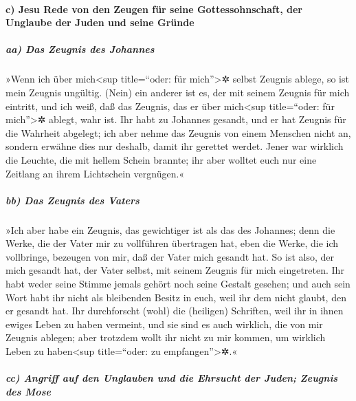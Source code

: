\hypertarget{c-jesu-rede-von-den-zeugen-fuxfcr-seine-gottessohnschaft-der-unglaube-der-juden-und-seine-gruxfcnde}{%
\paragraph{c) Jesu Rede von den Zeugen für seine Gottessohnschaft, der
Unglaube der Juden und seine
Gründe}\label{c-jesu-rede-von-den-zeugen-fuxfcr-seine-gottessohnschaft-der-unglaube-der-juden-und-seine-gruxfcnde}}

\hypertarget{aa-das-zeugnis-des-johannes}{%
\subparagraph{aa) Das Zeugnis des
Johannes}\label{aa-das-zeugnis-des-johannes}}

 »Wenn ich über mich\textless sup title=``oder: für
mich''\textgreater✲ selbst Zeugnis ablege, so ist mein Zeugnis ungültig.
 (Nein) ein anderer ist es, der mit seinem Zeugnis für
mich eintritt, und ich weiß, daß das Zeugnis, das er über
mich\textless sup title=``oder: für mich''\textgreater✲ ablegt, wahr
ist.  Ihr habt zu Johannes gesandt, und er hat Zeugnis
für die Wahrheit abgelegt;  ich aber nehme das Zeugnis
von einem Menschen nicht an, sondern erwähne dies nur deshalb, damit ihr
gerettet werdet.  Jener war wirklich die Leuchte, die mit
hellem Schein brannte; ihr aber wolltet euch nur eine Zeitlang an ihrem
Lichtschein vergnügen.«

\hypertarget{bb-das-zeugnis-des-vaters}{%
\subparagraph{bb) Das Zeugnis des
Vaters}\label{bb-das-zeugnis-des-vaters}}

 »Ich aber habe ein Zeugnis, das gewichtiger ist als das
des Johannes; denn die Werke, die der Vater mir zu vollführen übertragen
hat, eben die Werke, die ich vollbringe, bezeugen von mir, daß der Vater
mich gesandt hat.  So ist also, der mich gesandt hat, der
Vater selbst, mit seinem Zeugnis für mich eingetreten. Ihr habt weder
seine Stimme jemals gehört noch seine Gestalt gesehen; 
und auch sein Wort habt ihr nicht als bleibenden Besitz in euch, weil
ihr dem nicht glaubt, den er gesandt hat.  Ihr
durchforscht (wohl) die (heiligen) Schriften, weil ihr in ihnen ewiges
Leben zu haben vermeint, und sie sind es auch wirklich, die von mir
Zeugnis ablegen;  aber trotzdem wollt ihr nicht zu mir
kommen, um wirklich Leben zu haben\textless sup title=``oder: zu
empfangen''\textgreater✲.«

\hypertarget{cc-angriff-auf-den-unglauben-und-die-ehrsucht-der-juden-zeugnis-des-mose}{%
\subparagraph{cc) Angriff auf den Unglauben und die Ehrsucht der Juden;
Zeugnis des
Mose}\label{cc-angriff-auf-den-unglauben-und-die-ehrsucht-der-juden-zeugnis-des-mose}}

